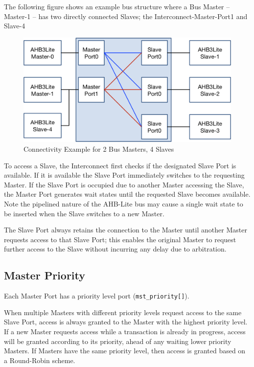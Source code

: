 The following figure shows an example bus structure where a Bus Master -- Master-1
-- has two directly connected Slaves; the Interconnect-Master-Port1 and
Slave-4

\begin{figure}[tbh]
	\includegraphics{assets/img/ahb-lite-switch-sys2}
	\caption{Connectivity Example for 2 Bus Masters, 4 Slaves}
	\label{fig:ahb-lite-switch-sys2}
\end{figure}

To access a Slave, the Interconnect first checks if the designated Slave
Port is available. If it is available the Slave Port immediately
switches to the requesting Master. If the Slave Port is occupied due to
another Master accessing the Slave, the Master Port generates wait
states until the requested Slave becomes available. Note the pipelined
nature of the AHB-Lite bus may cause a single wait state to be inserted
when the Slave switches to a new Master.

The Slave Port always retains the connection to the Master until another
Master requests access to that Slave Port; this enables the original
Master to request further access to the Slave without incurring any
delay due to arbitration.

\subsection{Master Priority}\label{master-priority}

Each Master Port has a priority level port (\texttt{mst\_priority[]}).

When multiple Masters with different priority levels request access to
the same Slave Port, access is always granted to the Master with the
highest priority level. If a new Master requests access while a
transaction is already in progress, access will be granted according to
its priority, ahead of any waiting lower priority Masters. If Masters
have the same priority level, then access is granted based on a
Round-Robin scheme.


